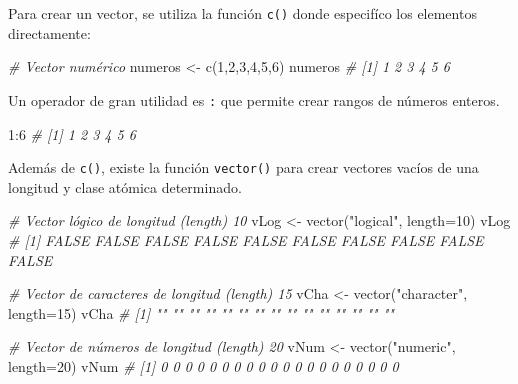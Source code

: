 \documentclass[
]{article}
\newenvironment{Shaded}{\begin{snugshade}}{\end{snugshade}}
\newcommand{\AttributeTok}[1]{\textcolor[rgb]{0.77,0.63,0.00}{#1}}
\newcommand{\CommentTok}[1]{\textcolor[rgb]{0.56,0.35,0.01}{\textit{#1}}}
\newcommand{\DecValTok}[1]{\textcolor[rgb]{0.00,0.00,0.81}{#1}}
\newcommand{\FunctionTok}[1]{\textcolor[rgb]{0.00,0.00,0.00}{#1}}
\newcommand{\NormalTok}[1]{#1}
\newcommand{\OtherTok}[1]{\textcolor[rgb]{0.56,0.35,0.01}{#1}}
\newcommand{\SpecialCharTok}[1]{\textcolor[rgb]{0.00,0.00,0.00}{#1}}
\newcommand{\StringTok}[1]{\textcolor[rgb]{0.31,0.60,0.02}{#1}}
\theoremstyle{definition}
\theoremstyle{definition}
\theoremstyle{definition}
\theoremstyle{definition}
\theoremstyle{remark}
\begin{document}
Para crear un vector, se utiliza la función \texttt{c()} donde especifíco los elementos directamente:

\begin{Shaded}
\begin{Highlighting}[]
\CommentTok{\# Vector numérico}
\NormalTok{numeros }\OtherTok{\textless{}{-}} \FunctionTok{c}\NormalTok{(}\DecValTok{1}\NormalTok{,}\DecValTok{2}\NormalTok{,}\DecValTok{3}\NormalTok{,}\DecValTok{4}\NormalTok{,}\DecValTok{5}\NormalTok{,}\DecValTok{6}\NormalTok{)}
\NormalTok{numeros}
\CommentTok{\# [1] 1 2 3 4 5 6}
\end{Highlighting}
\end{Shaded}

Un operador de gran utilidad es \texttt{:} que permite crear rangos de números enteros.

\begin{Shaded}
\begin{Highlighting}[]
\DecValTok{1}\SpecialCharTok{:}\DecValTok{6}
\CommentTok{\# [1] 1 2 3 4 5 6}
\end{Highlighting}
\end{Shaded}

Además de \texttt{c()}, existe la función \texttt{vector()} para crear vectores vacíos de una longitud y clase atómica determinado.

\begin{Shaded}
\begin{Highlighting}[]
\CommentTok{\# Vector lógico de longitud (length) 10}
\NormalTok{vLog }\OtherTok{\textless{}{-}} \FunctionTok{vector}\NormalTok{(}\StringTok{"logical"}\NormalTok{, }\AttributeTok{length=}\DecValTok{10}\NormalTok{)}
\NormalTok{vLog}
\CommentTok{\#  [1] FALSE FALSE FALSE FALSE FALSE FALSE FALSE FALSE FALSE FALSE}

\CommentTok{\# Vector de caracteres de longitud (length) 15}
\NormalTok{vCha }\OtherTok{\textless{}{-}} \FunctionTok{vector}\NormalTok{(}\StringTok{"character"}\NormalTok{, }\AttributeTok{length=}\DecValTok{15}\NormalTok{)}
\NormalTok{vCha}
\CommentTok{\#  [1] "" "" "" "" "" "" "" "" "" "" "" "" "" "" ""}

\CommentTok{\# Vector de números de longitud (length) 20}
\NormalTok{vNum }\OtherTok{\textless{}{-}} \FunctionTok{vector}\NormalTok{(}\StringTok{"numeric"}\NormalTok{, }\AttributeTok{length=}\DecValTok{20}\NormalTok{)}
\NormalTok{vNum}
\CommentTok{\#  [1] 0 0 0 0 0 0 0 0 0 0 0 0 0 0 0 0 0 0 0 0}
\end{Highlighting}
\end{Shaded}
\end{document}

